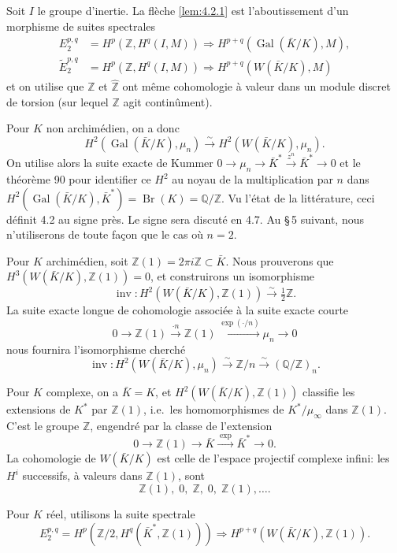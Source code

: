\documentclass[11pt]{amsart}
\theoremstyle{plain}
\theoremstyle{definition}
\DeclareMathOperator{\Gal}{Gal}
\DeclareMathOperator{\inv}{inv}
\DeclareMathOperator{\Br}{Br}
\newcommand{\Z}{\mathbb{Z}}
\newcommand{\Q}{\mathbb{Q}}
\begin{document}
Soit $I$ le groupe d'inertie. La fl\`eche \ref{lem:4.2.1} est l'aboutissement d'un morphisme de suites spectrales
\begin{align*}
E_2^{p,q}&=H^p(\Z,H^q(I,M))\Rightarrow H^{p+q}(\Gal(\bar K/K),M), \\
\tilde{E}_2^{p,q}&=H^p(\Z,H^q(I,M))\Rightarrow H^{p+q}(W(\bar K/K),M)
\end{align*}
et on utilise que $\Z$ et $\hat{\Z}$ ont m\^eme cohomologie \`a valeur dans un module discret de torsion (sur lequel $\Z$ agit contin\^ument).

Pour $K$ non archim\'edien, on a donc
\[
H^2(\Gal(\bar K/K),\mu_n)\xrightarrow{\sim}H^2(W(\bar K/K),\mu_n).
\]
On utilise alors la suite exacte de Kummer $0\to\mu_n\to\bar K^*\xrightarrow{z^n}\bar K^*\to0$ et le th\'eor\`eme 90 pour identifier ce $H^2$ au noyau de la multiplication par $n$ dans $H^2(\Gal(\bar K/K),\bar K^*)=\Br(K)=\Q/\Z$. Vu l'\'etat de la litt\'erature, ceci d\'efinit 4.2 au signe pr\`es. Le signe sera discut\'e en 4.7. Au \S\,5 suivant, nous n'utiliserons de toute fa\c{c}on que le cas o\`u $n=2$.

Pour $K$ archim\'edien, soit $\Z(1)=2\pi i\Z\subset\bar K$. Nous prouverons que $H^3(W(\bar K/K),\Z(1))=0$, et construirons un isomorphisme
\begin{equation}\label{eq:4.2.2}
\inv\colon H^2(W(\bar K/K),\Z(1))\xrightarrow{\sim}\tfrac12\Z.
\end{equation}
La suite exacte longue de cohomologie associ\'ee \`a la suite exacte courte
\[
0\longrightarrow\Z(1)\xrightarrow{\cdot n}\Z(1)\xrightarrow{\exp(\cdot/n)}\mu_n\longrightarrow 0
\]
nous fournira l'isomorphisme cherch\'e
\[
\inv\colon H^2(W(\bar K/K),\mu_n)\xrightarrow{\sim}\Z/n\xrightarrow{\sim}(\Q/\Z)_n.
\]

Pour $K$ complexe, on a $\bar K=K$, et $H^2(W(\bar K/K),\Z(1))$ classifie les extensions de $K^*$ par $\Z(1)$, i.e.~les homomorphismes de $K^*/\mu_\infty$ dans $\Z(1)$. C'est le groupe $\Z$, engendr\'e par la classe de l'extension
\begin{equation}\label{eq:4.2.3}
0\longrightarrow\Z(1)\longrightarrow\bar K\xrightarrow{\;\exp\;}\bar K^*\longrightarrow 0.
\end{equation}
La cohomologie de $W(\bar K/K)$ est celle de l'espace projectif complexe infini: les $H^i$ successifs, \`a valeurs dans $\Z(1)$, sont
\[
\Z(1),\;0,\;\Z,\;0,\;\Z(1),\ldots.
\]

Pour $K$ r\'eel, utilisons la suite spectrale
\[
E_2^{p,q}=H^p(\Z/2,H^q(\bar K^*,\Z(1)))\Rightarrow H^{p+q}(W(\bar K/K),\Z(1)).
\]
\end{document}
